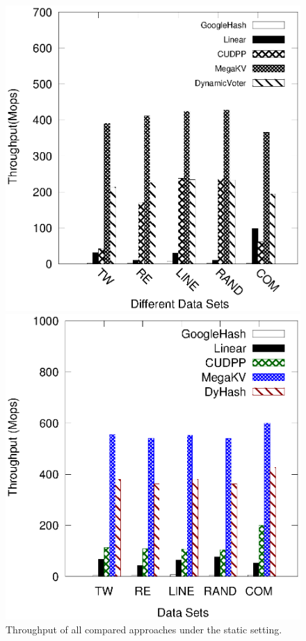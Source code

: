 \begin{figure}[t]
	\begin{minipage}{0.48\linewidth}\centering
	\includegraphics[width=\linewidth]{pic/static/static_insert.eps}
	\centerline{}
	\end{minipage}
	\hfill
	\begin{minipage}{0.48\linewidth}\centering
	\includegraphics[width=\linewidth]{pic/static/static_search.eps}
	\centerline{}
	\end{minipage}
	\caption{Throughput of all compared approaches under the static setting.}
	\label{fig:static}
\end{figure}

